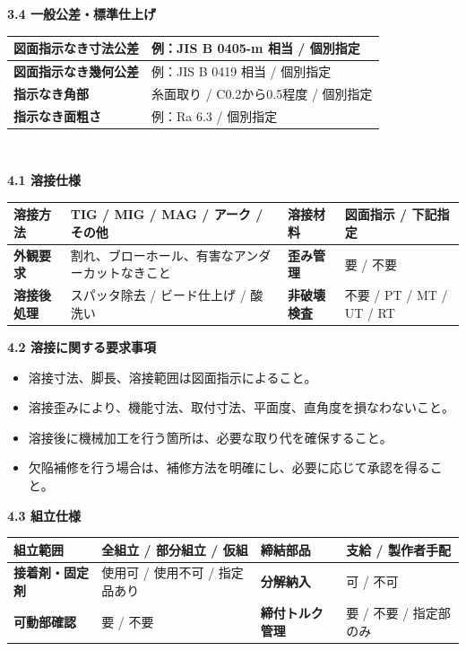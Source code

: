 \documentclass[a4paper,10pt]{ltjsarticle}
\makeatletter
\newlength{\SpecBodyWidth}
\newcommand{\PageTitle}[1]{%
  \vspace*{2mm}%
  \noindent\colorbox{SpecHead}{%
    \parbox{\dimexpr\SpecBodyWidth-2\fboxsep\relax}{%
      \large\bfseries\textcolor{white}{#1}%
    }%
  }%
  \par\vspace{5mm}%
}
\newcommand{\BlockTitle}[1]{%
  \vspace{4mm}%
  \noindent\colorbox{SpecSoft}{%
    \parbox{\dimexpr\SpecBodyWidth-2\fboxsep\relax}{%
      \normalsize\bfseries\textcolor{SpecHead}{#1}%
    }%
  }%
  \par\vspace{1.5mm}%
}
\newenvironment{SpecTable}[1]{%
  \par\vspace{1mm}%
  \noindent\footnotesize%
  \renewcommand{\arraystretch}{1.10}%
  \setlength{\tabcolsep}{3.0pt}%
  \begin{tabular*}{\SpecBodyWidth}{@{\extracolsep{\fill}}#1@{}}%
}{%
  \end{tabular*}%
  \par\vspace{1.5mm}%
}
\newcommand{\Lab}[1]{\textbf{\textcolor{SpecHead}{#1}}}
\newcommand{\YN}{要 / 不要}
\makeatother
\begin{document}
\BlockTitle{3.4 一般公差・標準仕上げ}
\begin{SpecTable}{|p{42mm}|p{104mm}|}
\hline
\Lab{図面指示なき寸法公差} & 例：JIS B 0405-m 相当 / 個別指定 \\
\hline
\Lab{図面指示なき幾何公差} & 例：JIS B 0419 相当 / 個別指定 \\
\hline
\Lab{指示なき角部} & 糸面取り / C0.2から0.5程度 / 個別指定 \\
\hline
\Lab{指示なき面粗さ} & 例：Ra 6.3 / 個別指定 \\
\hline
\end{SpecTable}

\clearpage

\PageTitle{4. 溶接仕様・組立仕様}

\BlockTitle{4.1 溶接仕様}
\begin{SpecTable}{|p{28mm}|p{43mm}|p{30mm}|p{43mm}|}
\hline
\Lab{溶接方法} & TIG / MIG / MAG / アーク / その他 & \Lab{溶接材料} & 図面指示 / 下記指定 \\
\hline
\Lab{外観要求} & 割れ、ブローホール、有害なアンダーカットなきこと & \Lab{歪み管理} & \YN \\
\hline
\Lab{溶接後処理} & スパッタ除去 / ビード仕上げ / 酸洗い & \Lab{非破壊検査} & 不要 / PT / MT / UT / RT \\
\hline
\end{SpecTable}

\BlockTitle{4.2 溶接に関する要求事項}
\begin{itemize}
  \item 溶接寸法、脚長、溶接範囲は図面指示によること。
  \item 溶接歪みにより、機能寸法、取付寸法、平面度、直角度を損なわないこと。
  \item 溶接後に機械加工を行う箇所は、必要な取り代を確保すること。
  \item 欠陥補修を行う場合は、補修方法を明確にし、必要に応じて承認を得ること。
\end{itemize}

\BlockTitle{4.3 組立仕様}
\begin{SpecTable}{|p{28mm}|p{43mm}|p{30mm}|p{43mm}|}
\hline
\Lab{組立範囲} & 全組立 / 部分組立 / 仮組 & \Lab{締結部品} & 支給 / 製作者手配 \\
\hline
\Lab{接着剤・固定剤} & 使用可 / 使用不可 / 指定品あり & \Lab{分解納入} & 可 / 不可 \\
\hline
\Lab{可動部確認} & \YN & \Lab{締付トルク管理} & 要 / 不要 / 指定部のみ \\
\hline
\end{SpecTable}
\end{document}
